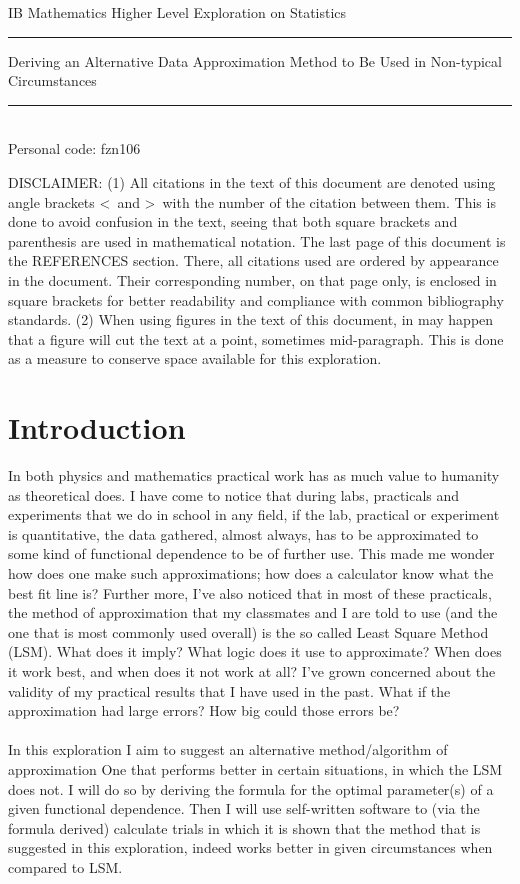 \begin{titlepage}
\begin{center}
IB Mathematics Higher Level Exploration on Statistics 
\\ 
\rule{\textwidth}{0.25pt}
\linebreak
\Huge{Deriving an Alternative Data Approximation Method to Be Used in Non-typical  Circumstances}
\rule{\textwidth}{0.25pt} \\
[15cm]
\large {Personal code: fzn106} \\

\end{center}
\end{titlepage}
\newpage
\tableofcontents
\vfill
\noindent
DISCLAIMER: (1) All citations in the text of this document are denoted using angle brackets \textless \ and \textgreater \ with the number of the citation between them. This is done to avoid confusion in the text, seeing that both square brackets and parenthesis are used in mathematical notation. The last page of this document is the REFERENCES section. There, all citations used are ordered by appearance in the document. Their corresponding number, on that page only, is enclosed in square brackets for better readability and compliance with common bibliography standards. (2) When using figures in the text of this document, in may happen that a figure will cut the text at a point, sometimes mid-paragraph. This is done as a measure to conserve space available for this exploration.
\clearpage
\newpage

\section{Introduction}
In both physics and mathematics practical work has as much value to humanity as theoretical does. I have come to notice that during labs, practicals and experiments that we do in school in any field, if the lab, practical or experiment is quantitative, the data gathered, almost always, has to be approximated to some kind of functional dependence to be of further use. This made me wonder how does one make such approximations; how does a calculator know what the best fit line is? Further more, I've also noticed that in most of these practicals, the method of approximation that my classmates and I  are told to use (and the one that is most commonly used overall) is the so called Least Square Method (LSM). What does it imply? What logic does it use to approximate? When does it work best, and when does it not work at all? I've grown concerned about the validity of my practical results that I have used in the past. What if the approximation had large errors? How big could those errors be? \\
\\
In this exploration I aim to suggest an alternative method/algorithm of approximation One that performs better in certain situations, in which the LSM does not. I will do so by deriving the formula for the optimal parameter(s) of a given functional dependence. Then I will use self-written software to (via the formula derived) calculate trials in which it is shown that the method that is suggested in this exploration, indeed works better in given circumstances when compared to LSM.
